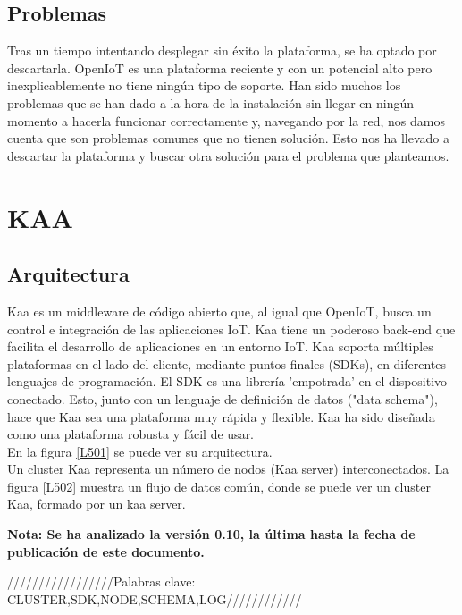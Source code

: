 \documentclass[12pt, twoside]{book}
\begin{document}
\section{Problemas}
Tras un tiempo intentando desplegar sin éxito la plataforma, se ha optado por descartarla. OpenIoT es una plataforma reciente y con un potencial alto pero inexplicablemente no tiene ningún tipo de soporte. Han sido muchos los problemas que se han dado a la hora de la instalación sin llegar en ningún momento a hacerla funcionar correctamente y, navegando por la red, nos damos cuenta que son problemas comunes que no tienen solución. Esto nos ha llevado a descartar la plataforma y buscar otra solución para el problema que planteamos.
\chapter{KAA}
\section{Arquitectura}
Kaa \cite{kaa}\cite{kaa_iot}\cite{code}\cite{doc} es un middleware de código abierto que, al igual que OpenIoT, busca un control e integración de las aplicaciones IoT. Kaa tiene un poderoso back-end que facilita el desarrollo de aplicaciones en un entorno IoT. Kaa soporta múltiples plataformas en el lado del cliente, mediante puntos finales (SDKs), en diferentes lenguajes de programación. El SDK es una librería 'empotrada' en el dispositivo conectado. Esto, junto con un lenguaje de definición de datos ("data schema"), hace que Kaa sea una plataforma muy rápida y flexible. Kaa ha sido diseñada como una plataforma robusta y fácil de usar.\\ En la figura \ref{L501} se puede ver su arquitectura.\\
Un cluster Kaa representa un número de nodos (Kaa server) interconectados. La figura \ref{L502} muestra un flujo de datos común, donde se puede ver un cluster Kaa, formado por un kaa server.  



\textbf{Nota: Se ha analizado la versión 0.10, la última hasta la fecha de publicación de este documento.}

/////////////////Palabras clave: CLUSTER,SDK,NODE,SCHEMA,LOG////////////\\
\end{document}
